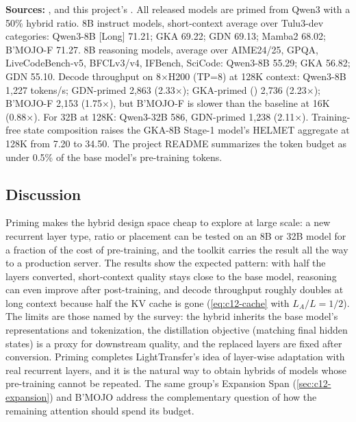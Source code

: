 \begin{results}
\textbf{Sources:} ,
 and this project's . All released models are
primed from Qwen3 with a 50\% hybrid ratio. 8B instruct models, short-context average over Tulu3-dev
categories: Qwen3-8B [Long] 71.21; GKA 69.22; GDN 69.13; Mamba2 68.02; B'MOJO-F 71.27. 8B reasoning
models, average over AIME24/25, GPQA, LiveCodeBench-v5, BFCLv3/v4, IFBench, SciCode: Qwen3-8B 55.29;
GKA 56.82; GDN 55.10. Decode throughput on 8$\times$H200 (TP=8) at 128K context: Qwen3-8B 1,227
tokens/s; GDN-primed 2,863 (2.33$\times$); GKA-primed () 2,736 (2.23$\times$);
B'MOJO-F 2,153 (1.75$\times$), but B'MOJO-F is slower than the baseline at 16K (0.88$\times$). For
32B at 128K: Qwen3-32B 586, GDN-primed 1,238 (2.11$\times$). Training-free state composition raises
the GKA-8B Stage-1 model's HELMET aggregate at 128K from 7.20 to 34.50. The project README summarizes
the token budget as under 0.5\% of the base model's pre-training tokens.
\end{results}

\subsection{Discussion}

Priming makes the hybrid design space cheap to explore at large scale: a new recurrent layer type,
ratio or placement can be tested on an 8B or 32B model for a fraction of the cost of pre-training,
and the toolkit carries the result all the way to a production server. The results show the
expected pattern: with half the layers converted, short-context quality stays close to the base
model, reasoning can even improve after post-training, and decode throughput roughly doubles at long
context because half the KV cache is gone (\eqref{eq:c12-cache} with $L_A/L = 1/2$). The limits are
those named by the survey: the hybrid inherits the base model's representations and tokenization,
the distillation objective (matching final hidden states) is a proxy for downstream quality, and the
replaced layers are fixed after conversion. Priming completes LightTransfer's idea of layer-wise
adaptation with real recurrent layers, and it is the natural way to obtain hybrids of models whose
pre-training cannot be repeated. The same group's Expansion Span (\cref{sec:c12-expansion}) and
B'MOJO address the complementary question of how the remaining attention should spend its budget.

